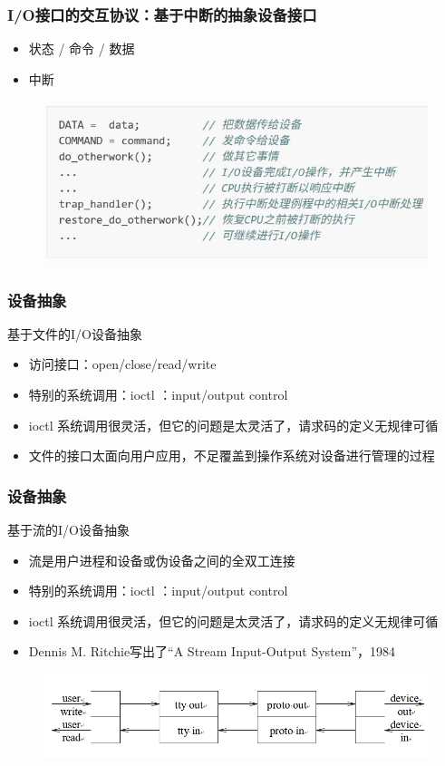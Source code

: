 \begin{frame}[fragile]
    \frametitle{I/O接口的交互协议：基于中断的抽象设备接口}
    \begin{itemize}
        \item 状态 / 命令 / 数据
        \item 中断
    \end{itemize}
    \begin{figure}
        \includegraphics[width=0.7\linewidth]{figs/intr-io-interface.png}
    \end{figure}
\end{frame}

\begin{frame}[fragile]
    \frametitle{设备抽象}
    基于文件的I/O设备抽象
    \begin{itemize}
        \item 访问接口：open/close/read/write
        \item 特别的系统调用：ioctl ：input/output control
        \item ioctl 系统调用很灵活，但它的问题是太灵活了，请求码的定义无规律可循
        \item 文件的接口太面向用户应用，不足覆盖到操作系统对设备进行管理的过程
    \end{itemize}

\end{frame}

\begin{frame}[fragile]
    \frametitle{设备抽象}
    基于流的I/O设备抽象
    \begin{itemize}
        \item 流是用户进程和设备或伪设备之间的全双工连接
        \item 特别的系统调用：ioctl ：input/output control
        \item ioctl 系统调用很灵活，但它的问题是太灵活了，请求码的定义无规律可循
        \item Dennis M. Ritchie写出了“A Stream Input-Output System”，1984
    \end{itemize}
        \begin{figure}
        \includegraphics[width=0.7\linewidth]{figs/stream.png}
    \end{figure}
\end{frame}

